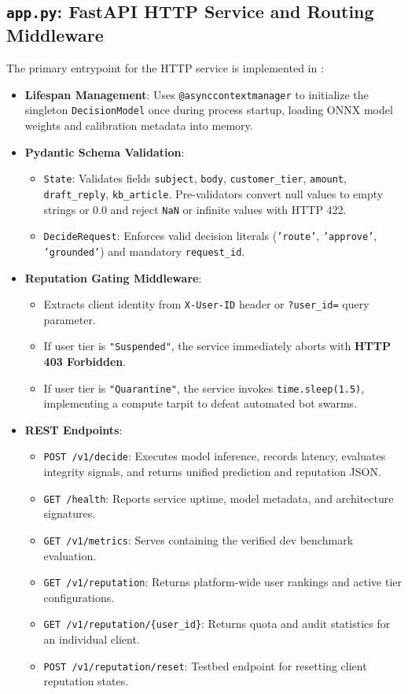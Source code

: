 \documentclass[11pt,a4paper]{article}
\begin{document}
\subsection{\texttt{app.py}: FastAPI HTTP Service and Routing Middleware}
The primary entrypoint for the HTTP service is implemented in :
\begin{itemize}
  \item \textbf{Lifespan Management}: Uses \texttt{@asynccontextmanager} to initialize the singleton \texttt{DecisionModel} once during process startup, loading ONNX model weights and calibration metadata into memory.
  \item \textbf{Pydantic Schema Validation}:
    \begin{itemize}
      \item \texttt{State}: Validates fields \texttt{subject}, \texttt{body}, \texttt{customer\_tier}, \texttt{amount}, \texttt{draft\_reply}, \texttt{kb\_article}. Pre-validators convert null values to empty strings or 0.0 and reject \texttt{NaN} or infinite values with HTTP 422.
      \item \texttt{DecideRequest}: Enforces valid decision literals (\texttt{'route'}, \texttt{'approve'}, \texttt{'grounded'}) and mandatory \texttt{request\_id}.
    \end{itemize}
  \item \textbf{Reputation Gating Middleware}:
    \begin{itemize}
      \item Extracts client identity from \texttt{X-User-ID} header or \texttt{?user\_id=} query parameter.
      \item If user tier is \texttt{"Suspended"}, the service immediately aborts with \textbf{HTTP 403 Forbidden}.
      \item If user tier is \texttt{"Quarantine"}, the service invokes \texttt{time.sleep(1.5)}, implementing a compute tarpit to defeat automated bot swarms.
    \end{itemize}
  \item \textbf{REST Endpoints}:
    \begin{itemize}
      \item \texttt{POST /v1/decide}: Executes model inference, records latency, evaluates integrity signals, and returns unified prediction and reputation JSON.
      \item \texttt{GET /health}: Reports service uptime, model metadata, and architecture signatures.
      \item \texttt{GET /v1/metrics}: Serves  containing the verified dev benchmark evaluation.
      \item \texttt{GET /v1/reputation}: Returns platform-wide user rankings and active tier configurations.
      \item \texttt{GET /v1/reputation/\{user\_id\}}: Returns quota and audit statistics for an individual client.
      \item \texttt{POST /v1/reputation/reset}: Testbed endpoint for resetting client reputation states.
    \end{itemize}
\end{itemize}
\end{document}
